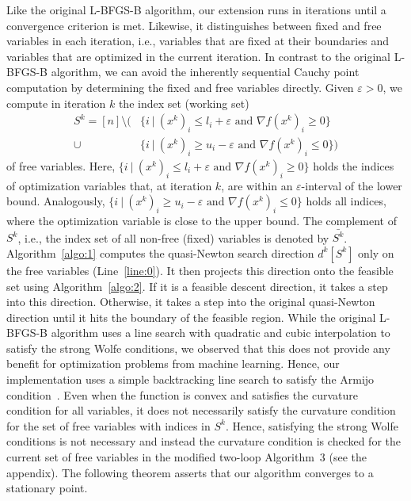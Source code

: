 \documentclass[letterpaper]{article} %
\newcommand{\vareps}{\varepsilon}
\begin{document}
Like the original  L-BFGS-B algorithm, our extension runs in iterations until a convergence criterion is met. Likewise, it distinguishes between fixed and free variables in each iteration, i.e., variables that are fixed at their boundaries and variables that are optimized in the current iteration. In contrast to the original L-BFGS-B algorithm, we can avoid the inherently sequential Cauchy point computation by determining the fixed and free variables directly. Given $\varepsilon >0$, we compute in iteration $k$ the index set (working set)
\begin{equation}
  \label{eq:ws}
\begin{aligned}
S^k = [n] \setminus \big ( & \big\{ i \ |\  (x^k)_i \leq l_i + \vareps \mbox{ and } \nabla f(x^k)_i \geq 0\big\} \\
\cup \, & \big\{ i \ |\  (x^k)_i \geq u_i - \vareps \mbox{ and } \nabla f(x^k)_i \leq 0\big\} \big )
\end{aligned}
\end{equation}
of free variables. Here, $\{i \ |\  (x^k)_i \leq l_i + \vareps \mbox{ and } \nabla f(x^k)_i \geq 0\}$ holds the indices of optimization variables that, at iteration $k$, are within an $\vareps$-interval of the lower bound. Analogously, $\{i \ |\  (x^k)_i \geq u_i - \vareps \mbox{ and } \nabla f(x^k)_i \leq 0\}$ holds all indices, where the optimization variable is close to the upper bound. The complement of $S^k$, i.e., the index set of all non-free (fixed) variables is denoted by $\bar{S^k}$. Algorithm~\ref{algo:1} computes the quasi-Newton search direction $d^k[S^k]$ only on the free variables (Line~\ref{line:0}). It then projects this direction onto the feasible set using Algorithm~\ref{algo:2}. If it is a feasible descent direction, it takes a step into this direction. Otherwise, it takes a step into the original quasi-Newton direction until it hits the boundary of the feasible region. While the original \mbox{L-BFGS-B} algorithm uses a line search with quadratic and cubic interpolation to satisfy the strong Wolfe conditions, we observed that this does not provide any benefit for optimization problems from machine learning. Hence, our implementation uses a simple backtracking line search to satisfy the Armijo condition~\cite{NocedalW99}. Even when the function is convex and satisfies the curvature condition for all variables, it does not necessarily satisfy the curvature condition for the set of free variables with indices in $S^k$. Hence, satisfying the strong Wolfe conditions is not necessary and instead the curvature condition is checked for the current set of free variables in the modified two-loop Algorithm~3 (see the appendix). The following theorem asserts that our algorithm converges to a stationary point.
\end{document}
